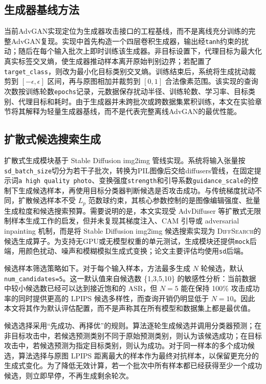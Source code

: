 \documentclass[type=bachelor,oneside]{fduthesis}
\newcommand{\methodname}{\textsc{DiffSearch}}
\begin{document}
\subsection{生成器基线方法}

当前AdvGAN实现定位为生成器攻击接口的工程基线，而不是离线充分训练的完整AdvGAN复现。实现中首先构造一个四层卷积生成器，输出经\texttt{tanh}约束的扰动；随后在每个输入批次上即时训练该生成器。非目标设置下，代理目标为最大化真实标签交叉熵，使生成器推动样本离开原始判别边界；若配置了\texttt{target\_class}，则改为最小化目标类别交叉熵。训练结束后，系统将生成扰动裁剪到 $[-\epsilon,\epsilon]$ 区间，再与原图相加并裁剪到 $[0,1]$ 合法像素范围。该实现的查询次数按训练轮数\texttt{epochs}记录，元数据保存扰动半径、训练轮数、学习率、目标类别、代理目标和耗时。由于生成器并未跨批次或跨数据集累积训练，本文在实验章节将其解释为轻量生成器基线，而不是代表完整离线AdvGAN的最优性能。

\subsection{扩散式候选搜索生成}

扩散式生成模块基于 Stable Diffusion img2img 管线实现。系统将输入张量按\texttt{sd\_batch\_size}切分为若干子批次，转换为PIL图像后交给diffusers管线，在固定提示词\texttt{a high quality photo}、变换强度\texttt{strength}和引导系数\texttt{guidance\_scale}的控制下生成候选样本，再使用目标分类器判断候选是否攻击成功。与传统梯度扰动不同，扩散候选样本不受 $L_p$ 范数球约束，其核心参数控制的是图像编辑强度、批量生成粒度和候选搜索预算。需要说明的是，本文实现受 AdvDiffuser 等扩散式无限制样本生成工作的启发，但并未复现其梯度注入、CAM 引导或 adversarial inpainting 机制，而是将 Stable Diffusion img2img 候选搜索实现为 \methodname 的候选生成算子。为支持无GPU或无模型权重的单元测试，生成模块还提供\texttt{mock}后端，用颜色扰动、噪声和模糊模拟生成式变换；论文主要评估均使用\texttt{sd}后端。

候选样本筛选策略如下。对于每个输入样本，方法最多生成 $N$ 轮候选，默认 \texttt{num\_candidates=5}。这一默认值来自候选数 \{1,3,5,10\} 的敏感性分析：当前数据中较小候选数已经可以达到接近饱和的 ASR，但 $N=5$ 能在保持 100\% 攻击成功率的同时提供更高的 LPIPS 候选多样性，而查询开销仍明显低于 $N=10$。因此本文将其作为默认评估配置，而不是声称其在所有模型和数据集上都是最优值。

候选选择采用“先成功、再择优”的规则。算法逐轮生成候选并调用分类器预测；在非目标攻击中，若候选预测类别不同于原始预测类别，则认为该候选成功；在目标攻击中，若候选预测为指定目标类别，则认为成功。对于同一样本的多个成功候选，算法选择与原图 LPIPS 距离最大的样本作为最终对抗样本，以保留更充分的生成式变化。为了降低无效计算，若一个批次中所有样本都已经获得至少一个成功候选，则立即早停，不再生成剩余轮次。
\end{document}
